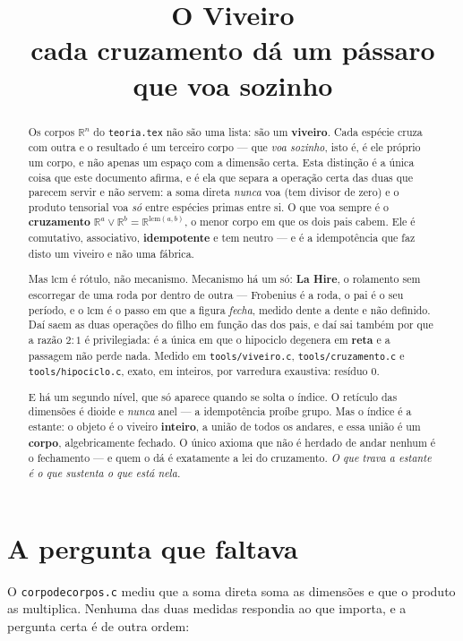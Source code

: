 \documentclass[11pt]{article}
\title{\textbf{O Viveiro}\\[3pt]
\large cada cruzamento dá um pássaro que voa sozinho}
\author{}\date{}
\newcommand{\code}[1]{\texttt{\small #1}}
\newcommand{\R}{\mathbb R}
\theoremstyle{plain}
\theoremstyle{remark}
\begin{document}
\maketitle

\begin{abstract}
\noindent Os corpos $\R^n$ do \code{teoria.tex} não são uma lista: são um \textbf{viveiro}. Cada
espécie cruza com outra e o resultado é um terceiro corpo --- que \emph{voa sozinho}, isto é, é ele
próprio um corpo, e não apenas um espaço com a dimensão certa. Esta distinção é a única coisa que este
documento afirma, e é ela que separa a operação certa das duas que parecem servir e não servem: a soma
direta \emph{nunca} voa (tem divisor de zero) e o produto tensorial voa \emph{só} entre espécies
primas entre si. O que voa sempre é o \textbf{cruzamento} $\R^a\vee\R^b=\R^{\mathrm{lcm}(a,b)}$, o
menor corpo em que os dois pais cabem. Ele é comutativo, associativo, \textbf{idempotente} e tem
neutro --- e é a idempotência que faz disto um viveiro e não uma fábrica.

Mas $\mathrm{lcm}$ é rótulo, não mecanismo. Mecanismo há um só: \textbf{La Hire}, o rolamento sem
escorregar de uma roda por dentro de outra --- Frobenius é a roda, o pai é o seu período, e o
$\mathrm{lcm}$ é o passo em que a figura \emph{fecha}, medido dente a dente e não definido. Daí saem
as duas operações do filho em função das dos pais, e daí sai também por que a razão $2:1$ é
privilegiada: é a única em que o hipociclo degenera em \textbf{reta} e a passagem não perde nada.
Medido em \code{tools/viveiro.c}, \code{tools/cruzamento.c} e \code{tools/hipociclo.c}, exato, em
inteiros, por varredura exaustiva: resíduo $0$.

E há um segundo nível, que só aparece quando se solta o índice. O retículo das dimensões é dioide e
\emph{nunca} anel --- a idempotência proíbe grupo. Mas o índice é a estante: o objeto é o viveiro
\textbf{inteiro}, a união de todos os andares, e essa união é um \textbf{corpo}, algebricamente
fechado. O único axioma que não é herdado de andar nenhum é o fechamento --- e quem o dá é
exatamente a lei do cruzamento. \emph{O que trava a estante é o que sustenta o que está nela.}
\end{abstract}

\section{A pergunta que faltava}

O \code{corpodecorpos.c} mediu que a soma direta soma as dimensões e que o produto as multiplica.
Nenhuma das duas medidas respondia ao que importa, e a pergunta certa é de outra ordem:
\end{document}

